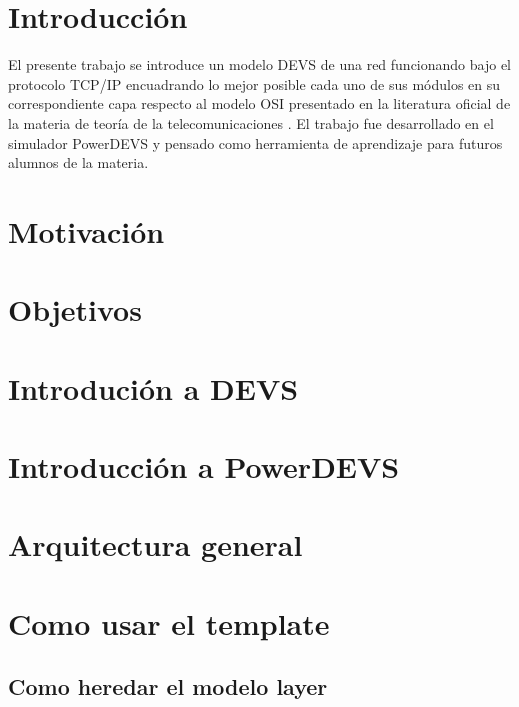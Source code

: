 \documentclass[10pt,a4paper]{article}
\begin{document}

\fecha{\today}



\maketitle

\tableofcontents
\newpage

\section{Introducción}

El presente trabajo se introduce un modelo DEVS de una red funcionando bajo el protocolo TCP/IP encuadrando lo mejor posible cada uno de sus módulos en su correspondiente capa respecto al modelo OSI presentado en la literatura oficial de la materia de teoría de la telecomunicaciones \cite{peterson2007computer}. El trabajo fue desarrollado en el simulador PowerDEVS y pensado como herramienta de aprendizaje para futuros alumnos de la materia.

\section{Motivación}
\section{Objetivos}
\section{Introdución a DEVS}
\section{Introducción a PowerDEVS}
\section{Arquitectura general}
\section{Como usar el template}
\subsection{Como heredar el modelo layer}
\end{document}
